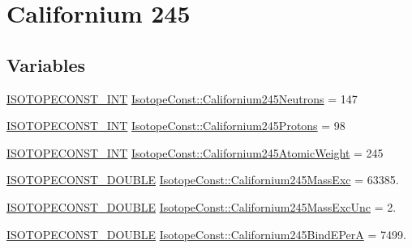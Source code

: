 \hypertarget{group___isotope_const-_californium-_cf245}{}\section{Californium 245}
\label{group___isotope_const-_californium-_cf245}
\subsection*{Variables}
\begin{DoxyCompactItemize}
\item 
\mbox{\hyperlink{group___isotope_const-_macros_ga5f18360b3e99483a35c32d789e62621c}{I\+S\+O\+T\+O\+P\+E\+C\+O\+N\+S\+T\+\_\+\+I\+NT}} \mbox{\hyperlink{group___isotope_const-_californium-_cf245_ga6d9d6a7839268c21784db82aaeb62b6c}{Isotope\+Const\+::\+Californium245\+Neutrons}} = 147
\item 
\mbox{\hyperlink{group___isotope_const-_macros_ga5f18360b3e99483a35c32d789e62621c}{I\+S\+O\+T\+O\+P\+E\+C\+O\+N\+S\+T\+\_\+\+I\+NT}} \mbox{\hyperlink{group___isotope_const-_californium-_cf245_gaaded657eb2514cdcb233bb6687cd7f00}{Isotope\+Const\+::\+Californium245\+Protons}} = 98
\item 
\mbox{\hyperlink{group___isotope_const-_macros_ga5f18360b3e99483a35c32d789e62621c}{I\+S\+O\+T\+O\+P\+E\+C\+O\+N\+S\+T\+\_\+\+I\+NT}} \mbox{\hyperlink{group___isotope_const-_californium-_cf245_gaf213c3abe3ef469f12d45e235dced984}{Isotope\+Const\+::\+Californium245\+Atomic\+Weight}} = 245
\item 
\mbox{\hyperlink{group___isotope_const-_macros_ga8f45a7272ce02c0b4c65c44636ed719a}{I\+S\+O\+T\+O\+P\+E\+C\+O\+N\+S\+T\+\_\+\+D\+O\+U\+B\+LE}} \mbox{\hyperlink{group___isotope_const-_californium-_cf245_ga882d6a02e1aef29cd74207747fc8dd27}{Isotope\+Const\+::\+Californium245\+Mass\+Exc}} = 63385.
\item 
\mbox{\hyperlink{group___isotope_const-_macros_ga8f45a7272ce02c0b4c65c44636ed719a}{I\+S\+O\+T\+O\+P\+E\+C\+O\+N\+S\+T\+\_\+\+D\+O\+U\+B\+LE}} \mbox{\hyperlink{group___isotope_const-_californium-_cf245_gab387bd4f53d0e346ab8229b00a871247}{Isotope\+Const\+::\+Californium245\+Mass\+Exc\+Unc}} = 2.
\item 
\mbox{\hyperlink{group___isotope_const-_macros_ga8f45a7272ce02c0b4c65c44636ed719a}{I\+S\+O\+T\+O\+P\+E\+C\+O\+N\+S\+T\+\_\+\+D\+O\+U\+B\+LE}} \mbox{\hyperlink{group___isotope_const-_californium-_cf245_gae477cba9482c6ac96c0f53c942bf7b31}{Isotope\+Const\+::\+Californium245\+Bind\+E\+PerA}} = 7499.

\end{DoxyCompactItemize}
